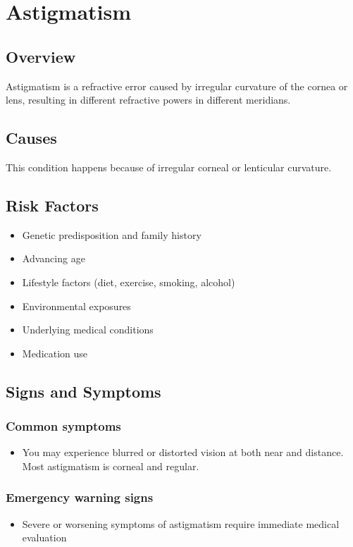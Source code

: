 \chapter{Astigmatism}
\label{sec:Astigmatism}

\section{Overview}
Astigmatism is a refractive error caused by irregular curvature of the cornea or lens, resulting in different refractive powers in different meridians.
\section{Causes}
This condition happens because of irregular corneal or lenticular curvature.     
\section{Risk Factors}

\begin{itemize}[noitemsep]
  \item Genetic predisposition and family history
  \item Advancing age
  \item Lifestyle factors (diet, exercise, smoking, alcohol)
  \item Environmental exposures
  \item Underlying medical conditions
  \item Medication use
\end{itemize}
\section{Signs and Symptoms}

\subsection{Common symptoms}
\begin{itemize}[noitemsep]
  \item You may experience blurred or distorted vision at both near and distance. Most astigmatism is corneal and regular. 
  \end{itemize}

\subsection{Emergency warning signs}
\begin{itemize}[noitemsep]
  \item Severe or worsening symptoms of astigmatism require immediate medical evaluation
\end{itemize}
